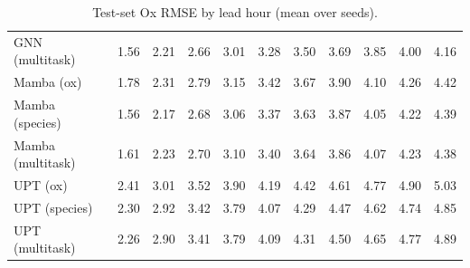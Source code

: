 \begin{table}[t]
\begin{tabular}{lrrrrrrrrrr}
GNN (multitask) & 1.56 & 2.21 & 2.66 & 3.01 & 3.28 & 3.50 & 3.69 & 3.85 & 4.00 & 4.16 \\
Mamba (ox) & 1.78 & 2.31 & 2.79 & 3.15 & 3.42 & 3.67 & 3.90 & 4.10 & 4.26 & 4.42 \\
Mamba (species) & 1.56 & 2.17 & 2.68 & 3.06 & 3.37 & 3.63 & 3.87 & 4.05 & 4.22 & 4.39 \\
Mamba (multitask) & 1.61 & 2.23 & 2.70 & 3.10 & 3.40 & 3.64 & 3.86 & 4.07 & 4.23 & 4.38 \\
UPT (ox) & 2.41 & 3.01 & 3.52 & 3.90 & 4.19 & 4.42 & 4.61 & 4.77 & 4.90 & 5.03 \\
UPT (species) & 2.30 & 2.92 & 3.42 & 3.79 & 4.07 & 4.29 & 4.47 & 4.62 & 4.74 & 4.85 \\
UPT (multitask) & 2.26 & 2.90 & 3.41 & 3.79 & 4.09 & 4.31 & 4.50 & 4.65 & 4.77 & 4.89 \\
\bottomrule
\end{tabular}
\caption{Test-set Ox RMSE by lead hour (mean over seeds).}
\label{tab:lead-rmse}
\end{table}
